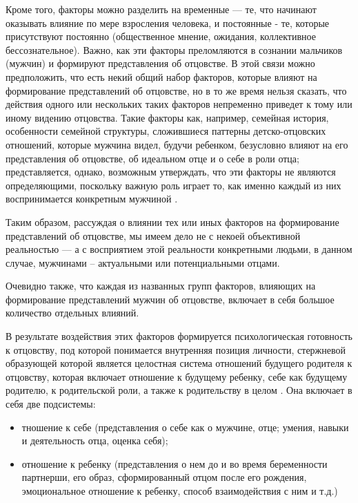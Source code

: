 \documentclass{../../common/thesisbyxetex}
\begin{document}
Кроме того, факторы можно разделить на временные --- те, что начинают оказывать влияние по мере
взросления человека, и постоянные - те, которые присутствуют
постоянно  (общественное мнение, ожидания, коллективное бессознательное). Важно, как эти
факторы преломляются в сознании мальчиков (мужчин) и формируют представления об отцовстве. В этой
связи можно предположить, что есть некий общий набор факторов, которые влияют на формирование
представлений об
отцовстве, но в то же время нельзя сказать, что действия одного или нескольких таких факторов
непременно приведет к тому или иному видению отцовства. Такие факторы как, например, семейная
история, особенности семейной структуры, сложившиеся паттерны детско-отцовских отношений,
которые мужчина видел, будучи ребенком, безусловно влияют на его представления об отцовстве, об
идеальном отце и о себе в роли отца; представляется, однако, возможным утверждать, что эти
факторы не являются определяющими, поскольку важную роль играет то, как именно каждый из них
воспринимается конкретным мужчиной \cite[164]{long}.

Таким образом, рассуждая о влиянии тех или иных факторов на формирование
представлений об отцовстве, мы имеем дело не с некоей объективной реальностью --- а с восприятием
этой реальности конкретными людьми, в данном случае, мужчинами -- актуальными или потенциальными
отцами.

Очевидно также, что каждая из названных групп факторов, влияющих на формирование представлений
мужчин об отцовстве, включает в себя большое количество отдельных влияний.

В результате воздействия этих факторов формируется психологическая готовность к отцовству, под 
которой понимается
внутренняя позиция личности,
стержневой образующей которой является целостная система отношений будущего
родителя к отцовству, которая включает отношение к будущему ребенку, себе как
будущему родителю, к родительской роли, а также к родительству в целом \cite[121]{har}. Она
включает в себя  две подсистемы:

\begin{itemize}
\item тношение к себе (представления о себе как
о мужчине, отце; умения, навыки и деятельность
отца, оценка себя);

\item отношение к ребенку (представления о нем до и во время беременности партнерши, его образ,
сформированный отцом после его рождения, эмоциональное отношение к ребенку, способ взаимодействия с
ним и т.д.)\cite[40]{otage}
\end{itemize}
\end{document}
